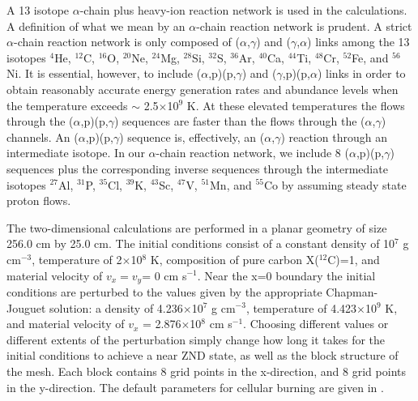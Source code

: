 A 13 isotope $\alpha$-chain plus heavy-ion reaction network is used
in the calculations.  A definition of what we mean by an
$\alpha$-chain reaction network is prudent. A strict $\alpha$-chain
reaction network is only composed of ($\alpha$,$\gamma$) and
($\gamma$,$\alpha$) links among the 13 isotopes $^4$He, $^{12}$C,
$^{16}$O, $^{20}$Ne, $^{24}$Mg, $^{28}$Si, $^{32}$S, $^{36}$Ar,
$^{40}$Ca, $^{44}$Ti, $^{48}$Cr, $^{52}$Fe, and $^{56}$Ni.  It is
essential, however, to include ($\alpha$,p)(p,$\gamma$) and
($\gamma$,p)(p,$\alpha$) links in order to obtain reasonably accurate
energy generation rates and abundance levels when the temperature
exceeds $\sim$ 2.5$\times$10$^{9}$ K. At these elevated temperatures
the flows through the ($\alpha$,p)(p,$\gamma$) sequences are faster
than the flows through the ($\alpha$,$\gamma$) channels.  An
($\alpha$,p)(p,$\gamma$) sequence is, effectively, an
($\alpha$,$\gamma$) reaction through an intermediate isotope.  In our
$\alpha$-chain reaction network, we include 8 ($\alpha$,p)(p,$\gamma$)
sequences plus the corresponding inverse sequences through the
intermediate isotopes $^{27}$Al, $^{31}$P, $^{35}$Cl, $^{39}$K,
$^{43}$Sc, $^{47}$V, $^{51}$Mn, and $^{55}$Co by assuming steady state
proton flows.  \begin{comment}This strategy permits inclusion of
($\alpha$,p)(p,$\gamma$) sequences without explicitly evolving the
proton or intermediate isotope abundances. Thus, the $\alpha$-chain
reaction network in Flash-X includes not just ($\alpha$,$\gamma$) and
($\gamma$,$\alpha$) links, but also links through the
($\alpha$,p)(p,$\gamma$) and ($\gamma$,p)(p,$\alpha$) sequences.  How
well this small reaction network mimics the nuclear energy generation
rate given by a large 489 isotope reaction network is analyzed in
(Timmes, Hoffman, \& Woosley 2000).\end{comment}

The two-dimensional calculations are performed in a planar geometry of size 256.0 cm by 25.0 cm.
The
initial conditions consist of a constant density of 10$^7$ g
cm$^{-3}$, temperature of 2$\times$10$^{8}$ K, composition of pure
carbon X($^{12}$C)=1, and material velocity of $v_{x}=v_{y}$= 0 cm
s$^{-1}$.  Near the x=0 boundary the initial conditions are perturbed to the
values given by the appropriate Chapman-Jouguet solution: a density of
4.236$\times$10$^7$ g cm$^{-3}$, temperature of 4.423$\times$10$^9$ K,
and material velocity of $v_{x}$ = 2.876$\times$10$^8$ cm s$^{-1}$.
Choosing different values
or different extents of the perturbation simply change how long it
takes for the initial conditions to achieve a near ZND state, as well as
the block structure of the mesh.  Each block contains 8 grid points in the
x-direction, and 8 grid points in the y-direction. The default parameters for
cellular burning are given in .


